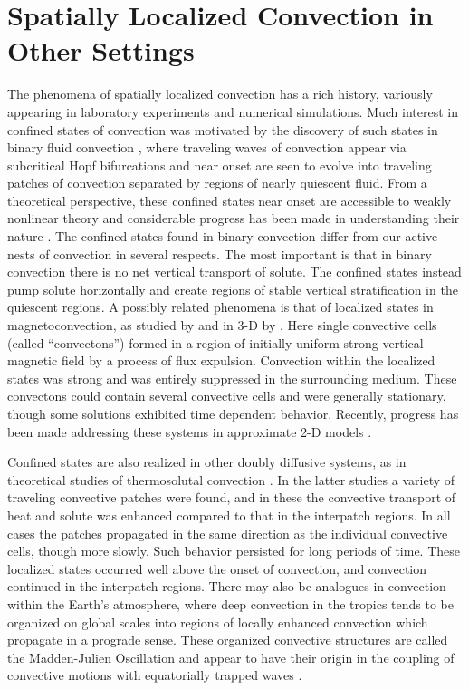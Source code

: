 \section{Spatially Localized Convection in Other Settings}
The phenomena of spatially localized convection has a rich history,
variously appearing in laboratory experiments and numerical
simulations.  Much interest in confined states of convection was
motivated by the discovery of such states in binary fluid convection
\citep[e.g.,][]{ Anderson&Behringer_1990, Kolodner&Glazier_1990,
Niemela_et_al_1990, Surko_et_al_1991}, where traveling waves of
convection appear via subcritical Hopf bifurcations and near onset are
seen to evolve into traveling patches of convection separated by
regions of nearly quiescent fluid.  From a theoretical perspective,
these confined states near onset are accessible to weakly nonlinear
theory and considerable progress has been made in understanding their nature
\citep[e.g.,][]{Riecke_1992,Barten_et_al_1995b, Batiste_Knobloch_2005,
Batiste_et_al_2006, Burke_Knobloch_2007}.  The confined states found
in binary convection differ from our active nests of convection in
several respects.  The most important is that in binary convection
there is no net vertical transport of solute.  The confined states
instead pump solute horizontally and create regions of stable vertical
stratification in the quiescent regions.  A possibly related phenomena
is that of localized states in magnetoconvection, as studied by
\cite{Blanchflower_1999} and in 3-D by \cite{Blanchflower_Weiss_2002}.
Here single convective cells (called ``convectons'') formed in a
region of initially uniform strong vertical magnetic field by a process of
flux expulsion.  Convection within the localized states was strong and
was entirely suppressed in the surrounding medium.  These convectons could
contain several convective cells and were generally stationary, though
some solutions exhibited time dependent behavior.  Recently, progress
has been made addressing these systems in approximate 2-D models
\citep{Dawes_2007}.

Confined states are
also realized in other doubly diffusive systems, as in theoretical
studies of thermosolutal
convection \citep{Knobloch_et_al_1986, Deane_et_al_1987,
  Deane_et_al_1988, Spina_et_al_1998}.  In the latter studies a
variety of traveling convective patches were found, and in these
the convective transport of heat and solute was enhanced
compared to that in the interpatch regions.  In all cases the patches
propagated in the same direction as the individual convective cells,
though more slowly.  Such behavior persisted for long periods of time.  
These localized states occurred well above the onset of convection,
and convection continued in the interpatch regions.  There may also be
analogues in convection within the Earth's atmosphere, where
deep convection in the tropics tends to be organized on global scales
into regions of locally enhanced convection which propagate in a
prograde sense.  These organized convective structures are called the
Madden-Julien Oscillation and appear to have their origin in the
coupling of convective motions with equatorially trapped waves
 \citep[perhaps Rossby or Kelvin waves; see review by][]{Zhang_2005}.    



